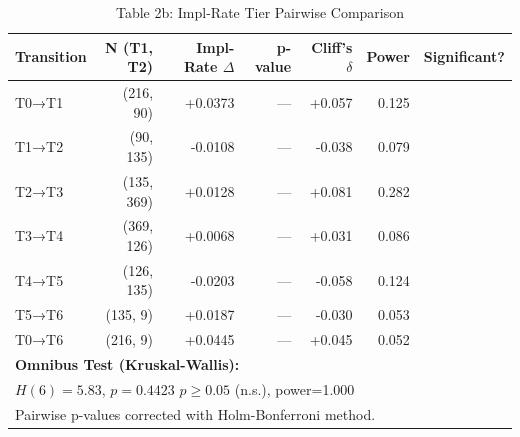 \begin{table}[htbp]
\centering
\caption{Table 2b: Impl-Rate Tier Pairwise Comparison}
\label{tab:impl_rate_tier_comparison}
\begin{tabular}{lrrrrrl}
\toprule
Transition & N (T1, T2) & Impl-Rate $\Delta$ & p-value & Cliff's $\delta$ & Power & Significant? \\
\midrule
T0→T1 & (216, 90) & +0.0373 & --- & +0.057 & 0.125 &  \\
T1→T2 & (90, 135) & -0.0108 & --- & -0.038 & 0.079 &  \\
T2→T3 & (135, 369) & +0.0128 & --- & +0.081 & 0.282 &  \\
T3→T4 & (369, 126) & +0.0068 & --- & +0.031 & 0.086 &  \\
T4→T5 & (126, 135) & -0.0203 & --- & -0.058 & 0.124 &  \\
T5→T6 & (135, 9) & +0.0187 & --- & -0.030 & 0.053 &  \\
T0→T6 & (216, 9) & +0.0445 & --- & +0.045 & 0.052 &  \\
\midrule
\multicolumn{7}{l}{\textbf{Omnibus Test (Kruskal-Wallis):}} \\
\multicolumn{7}{l}{$H(6)=5.83$, $p=0.4423$ $p \geq 0.05$ (n.s.), power=1.000} \\
\multicolumn{7}{l}{\footnotesize Pairwise p-values corrected with Holm-Bonferroni method.} \\
\bottomrule
\end{tabular}
\end{table}